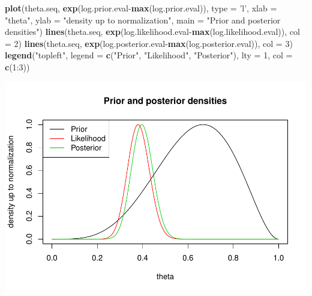 \documentclass[]{article}
\newenvironment{Shaded}{\begin{snugshade}}{\end{snugshade}}
\newcommand{\KeywordTok}[1]{\textcolor[rgb]{0.13,0.29,0.53}{\textbf{{#1}}}}
\newcommand{\DataTypeTok}[1]{\textcolor[rgb]{0.13,0.29,0.53}{{#1}}}
\newcommand{\DecValTok}[1]{\textcolor[rgb]{0.00,0.00,0.81}{{#1}}}
\newcommand{\StringTok}[1]{\textcolor[rgb]{0.31,0.60,0.02}{{#1}}}
\newcommand{\NormalTok}[1]{{#1}}
\begin{document}
\begin{Shaded}
\begin{Highlighting}[]
\KeywordTok{plot}\NormalTok{(theta.seq, }\KeywordTok{exp}\NormalTok{(log.prior.eval-}\KeywordTok{max}\NormalTok{(log.prior.eval)),}
     \DataTypeTok{type =} \StringTok{'l'}\NormalTok{, }\DataTypeTok{xlab =} \StringTok{"theta"}\NormalTok{, }\DataTypeTok{ylab =} \StringTok{"density up to normalization"}\NormalTok{,}
     \DataTypeTok{main =} \StringTok{"Prior and posterior densities"}\NormalTok{)}
\KeywordTok{lines}\NormalTok{(theta.seq, }\KeywordTok{exp}\NormalTok{(log.likelihood.eval-}\KeywordTok{max}\NormalTok{(log.likelihood.eval)), }\DataTypeTok{col =} \DecValTok{2}\NormalTok{)}
\KeywordTok{lines}\NormalTok{(theta.seq, }\KeywordTok{exp}\NormalTok{(log.posterior.eval-}\KeywordTok{max}\NormalTok{(log.posterior.eval)), }\DataTypeTok{col =} \DecValTok{3}\NormalTok{)}
\KeywordTok{legend}\NormalTok{(}\StringTok{"topleft"}\NormalTok{, }\DataTypeTok{legend =} \KeywordTok{c}\NormalTok{(}\StringTok{"Prior"}\NormalTok{, }\StringTok{"Likelihood"}\NormalTok{, }\StringTok{"Posterior"}\NormalTok{),}
       \DataTypeTok{lty =} \DecValTok{1}\NormalTok{, }\DataTypeTok{col =} \KeywordTok{c}\NormalTok{(}\DecValTok{1}\NormalTok{:}\DecValTok{3}\NormalTok{))}
\end{Highlighting}
\end{Shaded}

\includegraphics{Stats406Lab11_files/figure-latex/unnamed-chunk-3-1.pdf}
\end{document}
